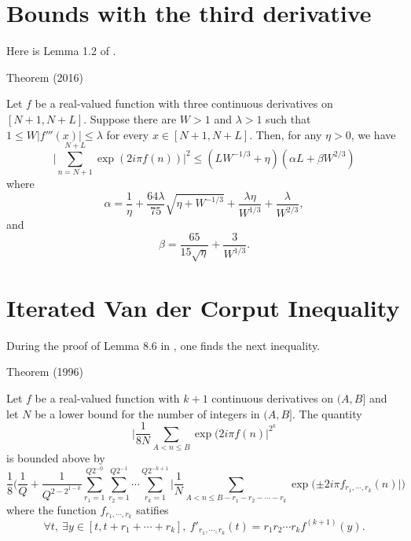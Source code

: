   
\par 
\section{Bounds with the third derivative}


Here is Lemma 1.2 of
\cite{Hiary*16}.
\par 
\begin{thm}{Theorem (2016)}

  Let $f$ be a real-valued function with three continuous derivatives
  on $[N+1, N+L]$. Suppose there are $W > 1$ and $\lambda > 1$ such
  that $1 \le W |f'''(x)| \le \lambda$ for every $x\in [N+1,
  N+L]$. Then, for any $\eta > 0$, we have
  $$
  \biggl|\sum_{n= N+1}^{N+L}
  \exp( 2i\pi f(n)) \biggr|^2
  \le (LW^{-1/3} +\eta) (\alpha L + \beta W^{2/3})
  $$
  where
  $$
  \alpha = \frac{1}{\eta} +\frac{64\lambda}{75}
  \sqrt{\eta + W^{-1/3}}+\frac{\lambda\eta}{W^{1/3}}
  +\frac{\lambda}{W^{2/3}},
  $$
  and
  $$
  \beta = \frac{65}{15\sqrt{\eta}} + \frac{3}{W^{1/3}}.
  $$
\end{thm}


  
\par 
\section{Iterated Van der Corput Inequality}


During the proof of Lemma 8.6 in 
  \cite{Granville-Ramare*96},
  one finds the next inequality.
\par 
\begin{thm}{Theorem (1996)}

  Let $f$ be a real-valued function with $k+1$ continuous derivatives
  on $(A, B]$ and let $N$ be a lower bound for the number of integers
  in $(A,B]$. The quantity
  $$
  \biggl|\frac{1}{8N}
  \sum_{A < n\le B} \exp(2 i \pi f(n)\biggr|^{2^k}
	    $$
	    is bounded above by
	    $$
	    \frac{1}{8}\biggl(
	    \frac{1}{Q} + \frac{1}{Q^{2-2^{1-k}}}
	    \sum_{r_1=1}^{Q2^{-0}}
	    \sum_{r_2=1}^{Q2^{-1}}
	    \cdots
	    \sum_{r_k=1}^{Q2^{-k+1}}
	    \biggl|
	    \frac{1}{N}
	    \sum_{A < n \le B-r_1-r_2-\cdots-r_k}
		    \exp(\pm 2i\pi f_{r_1,\cdots,r_k}(n)   
	    \biggr|
	    \biggr)
		      $$
		      where the function $f_{r_1,\cdots,r_k}$ satifies
		      $$
		      \forall t,\ \exists y\in[t, t+r_1+\cdots+r_k],
		      \ f'_{r_1,\cdots, r_k}(t)=r_1r_2\cdots r_k f^{(k+1)}(y).
		      $$
\end{thm}



